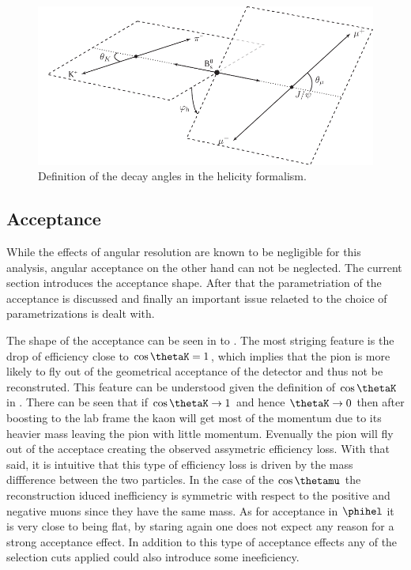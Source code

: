 \begin{figure}[h]
\begin{center}
  \includegraphics[width=\textwidth]{Figures/Chapter4/helAngles.pdf}
  \caption{Definition of the decay angles in the helicity formalism.}
  \label{helAngles}  
\end{center}
\end{figure}


\subsection{Acceptance}
\label{Accceptance}
While the effects of angular resolution are known to be negligible for this analysis, angular acceptance on the other hand can
not be neglected. The current section introduces the acceptance shape. After that the parametriation of the acceptance is discussed
and finally an important issue relaeted to the choice of parametrizations is dealt with.

The shape of the acceptance can be seen in  to . The most striging feature is the drop of efficiency 
close to $\cos\thetaK=1$, which implies that the pion is more likely to fly out of the geometrical acceptance of the detector
and thus not be reconstruted. This feature can be understood given the  definition of $\cos\thetaK$ in . 
There can be seen that if $\cos\thetaK\rightarrow 1$ and hence $\thetaK \rightarrow 0$ then after boosting
to the lab frame the kaon will get most of the \Kstar momentum due to its heavier mass leaving the pion with little momentum.
Evenually the pion will fly out of the acceptace creating the observed assymetric efficiency loss. With that said, it is intuitive that
this type of efficiency loss is driven by the mass diffference between the two particles. In the case of the $\cos\thetamu$ the
reconstruction iduced inefficiency is symmetric with respect to the positive and negative muons since they have the same mass.
As for acceptance in $\phihel$ it is very close to being flat, by staring again  one does not expect any
reason for a strong acceptance effect. In addition to this type of acceptance effects any of the selection cuts applied could also
introduce some ineeficiency.  

